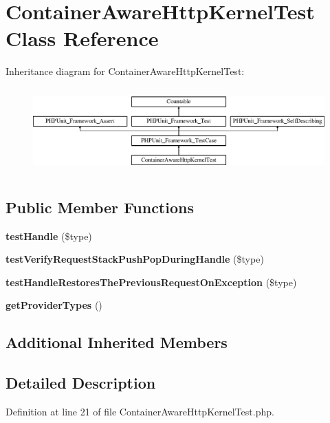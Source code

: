 \section{Container\+Aware\+Http\+Kernel\+Test Class Reference}
\label{class_symfony_1_1_component_1_1_http_kernel_1_1_tests_1_1_dependency_injection_1_1_container_aware_http_kernel_test}
Inheritance diagram for Container\+Aware\+Http\+Kernel\+Test\+:\begin{figure}[H]
\begin{center}
\leavevmode
\includegraphics[height=3.303835cm]{class_symfony_1_1_component_1_1_http_kernel_1_1_tests_1_1_dependency_injection_1_1_container_aware_http_kernel_test}
\end{center}
\end{figure}
\subsection*{Public Member Functions}
\begin{DoxyCompactItemize}
\item 
{\bf test\+Handle} (\$type)
\item 
{\bf test\+Verify\+Request\+Stack\+Push\+Pop\+During\+Handle} (\$type)
\item 
{\bf test\+Handle\+Restores\+The\+Previous\+Request\+On\+Exception} (\$type)
\item 
{\bf get\+Provider\+Types} ()
\end{DoxyCompactItemize}
\subsection*{Additional Inherited Members}


\subsection{Detailed Description}


Definition at line 21 of file Container\+Aware\+Http\+Kernel\+Test.\+php.



